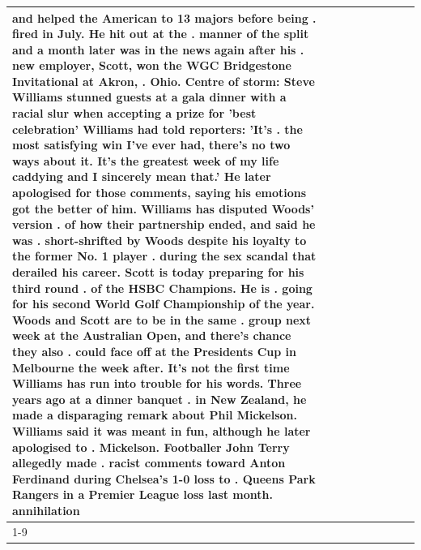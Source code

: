 \begin{table}[H]
\begin{tabular}{lllrlllll}
and helped the American to 13 majors before being . fired in July. He hit out at the . manner of the split and a month later was in the news again after his . new employer, Scott, won the WGC Bridgestone Invitational at Akron, . Ohio. Centre of storm: Steve Williams stunned guests at a gala dinner with a racial slur when accepting a prize for 'best celebration' Williams had told reporters: 'It's . the most satisfying win I've ever had, there's no two ways about it. It's the greatest week of my life caddying and I sincerely mean that.' He later apologised for those comments, saying his emotions got the better of him. Williams has disputed Woods' version . of how their partnership ended, and said he was . short-shrifted by Woods despite his loyalty to the former No. 1 player . during the sex scandal that derailed his career. Scott is today preparing for his third round . of the HSBC Champions. He is . going for his second World Golf Championship of the year. Woods and Scott are to be in the same . group next week at the Australian Open, and there's chance they also . could face off at the Presidents Cup in Melbourne the week after. It's not the first time Williams has run into trouble for his words. Three years ago at a dinner banquet . in New Zealand, he made a disparaging remark about Phil Mickelson. Williams said it was meant in fun, although he later apologised to . Mickelson. Footballer John Terry allegedly made . racist comments toward Anton Ferdinand during Chelsea's 1-0 loss to . Queens Park Rangers in a Premier League loss last month. annihilation \\
\cline{1-9}

\end{tabular}
\end{table}
